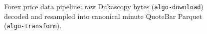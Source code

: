 \begin{figure}[htbp]
\centering

\caption{Forex price data pipeline: raw Dukascopy bytes (\texttt{algo-download}) decoded and resampled into canonical minute QuoteBar Parquet (\texttt{algo-transform}).}
\label{fig:data-pipeline}
\end{figure}
